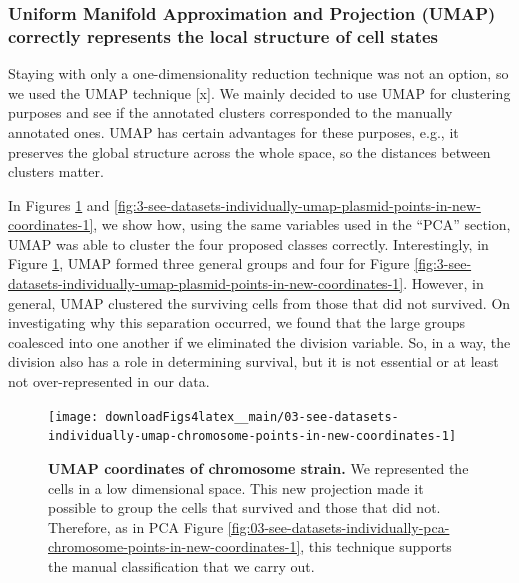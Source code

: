 \documentclass[a4paper, nobind]{templates/ociamthesis}
\begin{document}
\hypertarget{uniform-manifold-approximation-and-projection-umap-correctly-represents-the-local-structure-of-cell-states}{%
\subsubsection{Uniform Manifold Approximation and Projection (UMAP) correctly represents the local structure of cell states}\label{uniform-manifold-approximation-and-projection-umap-correctly-represents-the-local-structure-of-cell-states}}

Staying with only a one-dimensionality reduction technique was not an option, so we used the UMAP technique {[}x{]}.
We mainly decided to use UMAP for clustering purposes and see if the annotated clusters corresponded to the manually annotated ones.
UMAP has certain advantages for these purposes, e.g., it preserves the global structure across the whole space, so the distances between clusters matter.

In Figures \ref{fig:03-see-datasets-individually-umap-chromosome-points-in-new-coordinates-1} and \ref{fig:3-see-datasets-individually-umap-plasmid-points-in-new-coordinates-1}, we show how, using the same variables used in the ``PCA'' section, UMAP was able to cluster the four proposed classes correctly.
Interestingly, in Figure \ref{fig:03-see-datasets-individually-umap-chromosome-points-in-new-coordinates-1}, UMAP formed three general groups and four for Figure \ref{fig:3-see-datasets-individually-umap-plasmid-points-in-new-coordinates-1}.
However, in general, UMAP clustered the surviving cells from those that did not survived.
On investigating why this separation occurred, we found that the large groups coalesced into one another if we eliminated the division variable.
So, in a way, the division also has a role in determining survival, but it is not essential or at least not over-represented in our data.





\begin{figure}[H]
\texttt{[image: downloadFigs4latex\_\_main/03-see-datasets-individually-umap-chromosome-points-in-new-coordinates-1]} \caption[UMAP coordinates of chromosome strain.]{\textbf{UMAP coordinates of chromosome strain.} We represented the cells in a low dimensional space. This new projection made it possible to group the cells that survived and those that did not. Therefore, as in PCA Figure \ref{fig:03-see-datasets-individually-pca-chromosome-points-in-new-coordinates-1}, this technique supports the manual classification that we carry out.}\label{fig:03-see-datasets-individually-umap-chromosome-points-in-new-coordinates-1}
\end{figure}
\end{document}
